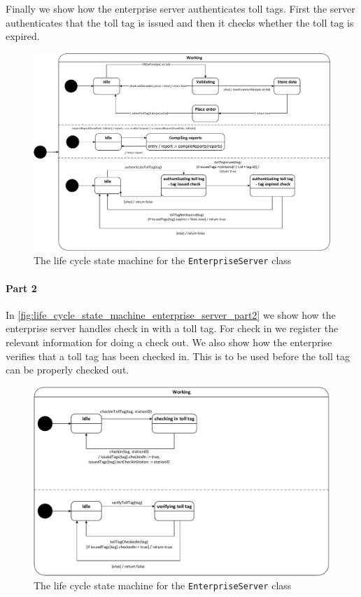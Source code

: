 Finally we show how the enterprise server authenticates toll tags. First the server authenticates that the toll tag is issued and then it checks  whether the toll tag is expired.

\begin{figure}[H]
\centering
\includegraphics[width=0.7\linewidth]{img/behaviour_state_machines/life_cycle_state_machines/life_cycle_state_machine_enterprise_server}
\caption{The life cycle state machine for the \texttt{EnterpriseServer} class}
\label{fig:life_cycle_state_machine_enterprise_server}
\end{figure}

\paragraph*{Part 2} In \autoref{fig:life_cycle_state_machine_enterprise_server_part2} we show how the enterprise server handles check in with a toll tag. For check in we register the relevant information for doing a check out. We also show how the enterprise verifies that a toll tag has been checked in. This is to be used before the toll tag can be properly checked out.

\begin{figure}[H]
\centering
\includegraphics[width=0.7\linewidth]{img/behaviour_state_machines/life_cycle_state_machines/life_cycle_state_machine_enterprise_server_part2}
\caption{The life cycle state machine for the \texttt{EnterpriseServer} class}
\label{fig:life_cycle_state_machine_enterprise_server_part2}
\end{figure}

